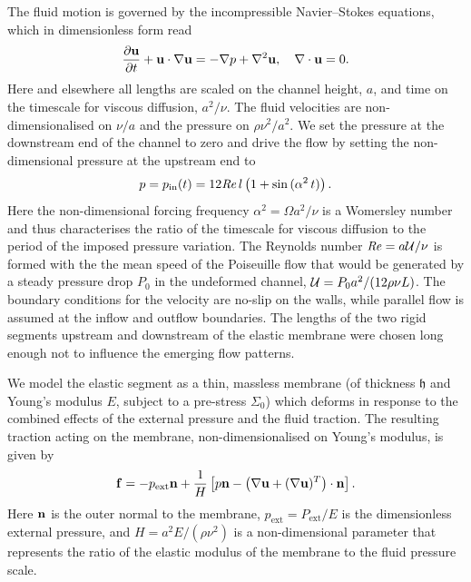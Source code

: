 \documentclass[aps,prl,reprint,superscriptaddress,floatfix]{revtex4-1}
\newcommand{\Rey}{\mathit{Re}}
\begin{document}
The fluid motion is governed by the incompressible Navier--Stokes
equations, which in dimensionless form read
\begin{equation}
\dfrac{\partial {\bf u}}{\partial t} + {\bf u} \cdot \nabla {\bf
u} = -\nabla  p + \nabla^2  {\bf u},\quad
\nabla \cdot {\bf u}= 0.
\label{eq:NSeqn}
\end{equation}
Here and elsewhere all lengths are scaled on the channel height,
$a$, and time on the timescale for viscous diffusion, $a^2/\nu$.
The fluid velocities are non-dimensionalised on $\nu/a$ and the
pressure on $\rho\nu^2/a^2$.
We set the pressure at the downstream end of the channel to zero
and drive the flow by setting the non-dimensional pressure at the
upstream end to
\begin{equation}
\label{inflow_bc}
p = p_{\rm in}(t)=12 \Rey \,l \left(1 + \sin\,(\alpha^2 \, t)\right).
\end{equation}
Here the non-dimensional forcing frequency $\alpha^2 = \Omega a^2/\nu$ is
a Womersley number and thus characterises the ratio of the
timescale for viscous diffusion to the period of the imposed pressure variation.
The Reynolds number $\Rey = a{\cal U}/\nu$ is formed with the the mean
speed of the Poiseuille flow that would be generated by a steady pressure
drop $P_0$ in the undeformed channel, ${\cal U} = P_0 a^2/(12 \rho \nu
L)$. The boundary conditions for the velocity are no-slip on the walls,
while parallel flow is assumed at the inflow and outflow
boundaries. The lengths of the two rigid segments upstream and
downstream of the elastic membrane were chosen long enough not to
influence the emerging flow patterns. 

We model the elastic segment as a thin, massless
membrane (of thickness $\mathfrak{h}$ and Young's modulus $E$, subject to a
pre-stress $\Sigma_0$) which deforms in
response to the combined effects of the external pressure
and the fluid traction. The resulting traction acting on the
membrane, non-dimensionalised on Young's modulus, is given by
\begin{equation}
\label{eq:nondimloadvector}
{\bf f}=-p_\text{ext} {\bf n} + \frac{1}{H} \left[ p {\bf n} -
  \left(\nabla {\bf u} + (\nabla {\bf u})^T\right) \cdot {\bf n} \right].
\end{equation}
Here ${\bf n}$ is the outer normal to the membrane,
$p_\text{ext}=P_\text{ext}/E$ is the dimensionless external
pressure, and  $H=a^2 E/(\rho\nu^2)$  is a non-dimensional parameter
that represents the ratio of the elastic modulus of the membrane to
the fluid pressure scale. 
\end{document}

